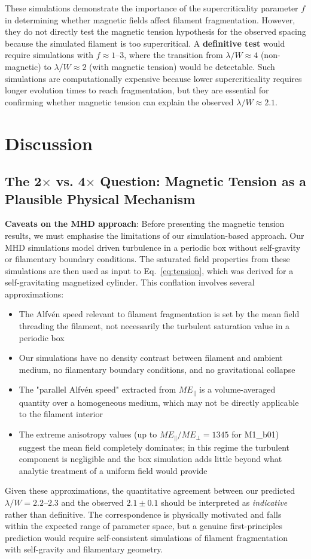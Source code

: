 \documentclass[11pt,a4paper]{article}
\begin{document}
These simulations demonstrate the importance of the supercriticality parameter $f$ in determining whether magnetic fields affect filament fragmentation. However, they do not directly test the magnetic tension hypothesis for the observed spacing because the simulated filament is too supercritical. A \textbf{definitive test} would require simulations with $f \approx 1$--$3$, where the transition from $\lambda/W \approx 4$ (non-magnetic) to $\lambda/W \approx 2$ (with magnetic tension) would be detectable. Such simulations are computationally expensive because lower supercriticality requires longer evolution times to reach fragmentation, but they are essential for confirming whether magnetic tension can explain the observed $\lambda/W \approx 2.1$.

\section{Discussion}

\subsection{The 2$\times$ vs. 4$\times$ Question: Magnetic Tension as a Plausible Physical Mechanism}

\textbf{Caveats on the MHD approach}: Before presenting the magnetic tension results, we must emphasise the limitations of our simulation-based approach. Our MHD simulations model driven turbulence in a periodic box without self-gravity or filamentary boundary conditions. The saturated field properties from these simulations are then used as input to Eq.~\ref{eq:tension}, which was derived for a self-gravitating magnetized cylinder. This conflation involves several approximations:
\begin{itemize}
    \item The Alfv\'en speed relevant to filament fragmentation is set by the mean field threading the filament, not necessarily the turbulent saturation value in a periodic box
    \item Our simulations have no density contrast between filament and ambient medium, no filamentary boundary conditions, and no gravitational collapse
    \item The "parallel Alfv\'en speed" extracted from $ME_\parallel$ is a volume-averaged quantity over a homogeneous medium, which may not be directly applicable to the filament interior
    \item The extreme anisotropy values (up to $ME_\parallel/ME_\perp = 1345$ for M1\_b01) suggest the mean field completely dominates; in this regime the turbulent component is negligible and the box simulation adds little beyond what analytic treatment of a uniform field would provide
\end{itemize}
Given these approximations, the quantitative agreement between our predicted $\lambda/W = 2.2$--$2.3$ and the observed $2.1 \pm 0.1$ should be interpreted as \textit{indicative} rather than definitive. The correspondence is physically motivated and falls within the expected range of parameter space, but a genuine first-principles prediction would require self-consistent simulations of filament fragmentation with self-gravity and filamentary geometry.
\end{document}
